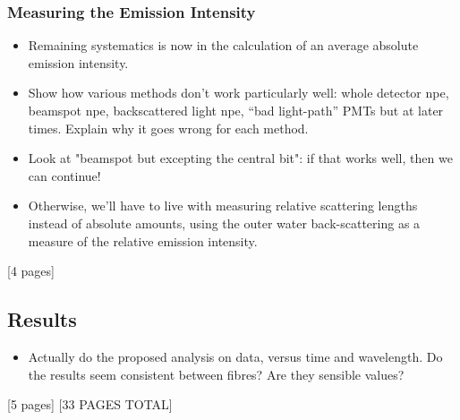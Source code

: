 {\subsubsection{Measuring the Emission Intensity}
\begin{itemize}
    \item Remaining systematics is now in the calculation of an average absolute emission intensity.
    \item Show how various methods don't work particularly well: whole detector npe, beamspot npe, backscattered light npe, ``bad light-path'' PMTs but at later times. Explain why it goes wrong for each method.
    \item Look at "beamspot but excepting the central bit": if that works well, then we can continue!
    \item Otherwise, we'll have to live with measuring relative scattering lengths instead of absolute amounts, using the outer water back-scattering as a measure of the relative emission intensity.
\end{itemize}
[4 pages]
\subsection{Results}
\begin{itemize}
    \item Actually do the proposed analysis on data, versus time and wavelength. Do the results seem consistent between fibres? Are they sensible values?
\end{itemize}
[5 pages]
[33 PAGES TOTAL]
}